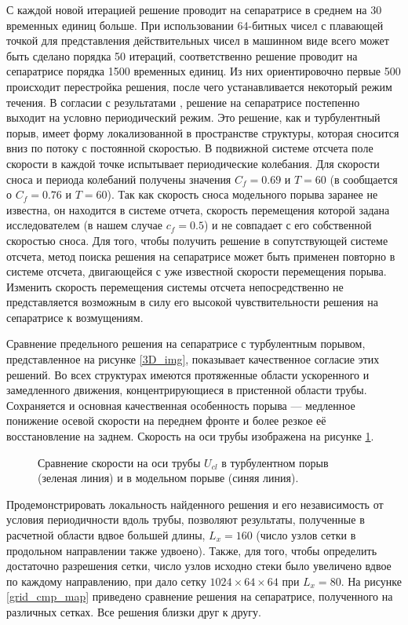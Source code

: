 С каждой новой итерацией решение проводит на сепаратрисе в среднем на 30 временных единиц больше. При использовании 64-битных чисел с плавающей точкой для представления действительных чисел в машинном виде всего может быть сделано порядка 50 итераций, соответственно решение проводит на сепаратрисе порядка 1500 временных единиц. Из них ориентировочно первые 500 происходит перестройка решения, после чего устанавливается некоторый режим течения. В согласии с результатами \cite{Avila2013}, решение на сепаратрисе постепенно выходит на условно периодический режим. Это решение, как и турбулентный порыв, имеет форму локализованной в пространстве структуры, которая сносится вниз по потоку с постоянной скоростью. В подвижной системе отсчета поле скорости в каждой точке испытывает периодические колебания. Для скорости сноса и периода колебаний получены значения $C_f=0.69$ и $T=60$ (в \cite{Avila2013} сообщается о $C_f=0.76$ и $T=60$). Так как скорость сноса модельного порыва заранее не известна, он находится в системе отчета, скорость перемещения которой задана исследователем (в нашем случае $c_f = 0.5$) и не совпадает с его собственной скоростью сноса. Для того, чтобы получить решение в сопутствующей системе отсчета, метод поиска решения на сепаратрисе может быть применен повторно в системе отсчета, двигающейся с уже известной скорости перемещения порыва. Изменить скорость перемещения системы отсчета непосредственно не представляется возможным в силу его высокой чувствительности решения на сепаратрисе к возмущениям. 


Сравнение предельного решения на сепаратрисе с турбулентным порывом, представленное на рисунке \ref{3D_img}, показывает качественное согласие этих решений. Во всех структурах имеются протяженные области ускоренного и замедленного движения, концентрирующиеся в пристенной области трубы. Сохраняется и основная качественная особенность порыва --- медленное понижение осевой скорости на переднем фронте и более резкое её восстановление на заднем. Скорость на оси трубы изображена на рисунке \ref{ucl_cmp_img}. 

\begin{figure}[h]
\caption{Сравнение скорости на оси трубы $U_{cl}$ в турбулентном порыв (зеленая линия) и в модельном порыве (синяя линия).}
\label{ucl_cmp_img}
\end{figure}

Продемонстрировать локальность найденного решения и его независимость от условия периодичности вдоль трубы, позволяют результаты, полученные в расчетной области вдвое большей длины, $L_x = 160$ (число узлов сетки в продольном направлении также удвоено). Также, для того, чтобы определить достаточно разрешения сетки, число узлов исходно стеки было увеличено вдвое по каждому направлению, при дало сетку $1024 \times 64 \times 64$ при $L_x = 80$. На рисунке \ref{grid_cmp_map} приведено сравнение решения на сепаратрисе, полученного на различных сетках. Все решения близки друг к другу. 



